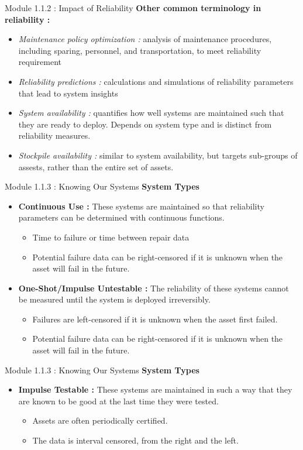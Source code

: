 \documentclass{beamer}
\begin{document}
\begin{frame}{Module 1.1.2 : Impact of Reliability}
\small
\textbf{Other common terminology in reliability :}
\begin{itemize}
\scriptsize
\item \textit{Maintenance policy optimization :} analysis of maintenance procedures, including sparing, personnel, and transportation, to meet reliability requirement
\item \textit{Reliability predictions :} calculations and simulations of reliability parameters that lead to system insights
\item \textit{System availability :} quantifies how well systems are maintained such that they are ready to deploy.  Depends on system type and is distinct from reliability measures.
\item \textit{Stockpile availability :} similar to system availability, but targets sub-groups of assests, rather than the entire set of assets.
\end{itemize}
\end{frame}

\begin{frame}{Module 1.1.3 : Knowing Our Systems}
\textbf{System Types}
\begin{itemize}
\small
\item \textbf{Continuous Use : } These systems are maintained so that reliability parameters can be determined with continuous functions.
\begin{itemize}
\small
\item Time to failure or time between repair data
\item Potential failure data can be right-censored if it is unknown when the asset will fail in the future.
\end{itemize}
\item \textbf{One-Shot/Impulse Untestable :} The reliability of these systems cannot be measured until the system is deployed irreversibly.
\begin{itemize}
\small
\item Failures are left-censored if it is unknown when the asset first failed.
\item Potential failure data can be right-censored if it is unknown when the asset will fail in the future.
\end{itemize}
\end{itemize}
\end{frame}

\begin{frame}{Module 1.1.3 : Knowing Our Systems}
\textbf{System Types}
\begin{itemize}
\small
\item \textbf{Impulse Testable : } These systems are maintained in such a way that they are known to be good at the last time they were tested.
\begin{itemize}
\small
\item Assets are often periodically certified.
\item The data is interval censored, from the right and the left.
\end{itemize}
\end{itemize}
\end{frame}
\end{document}
